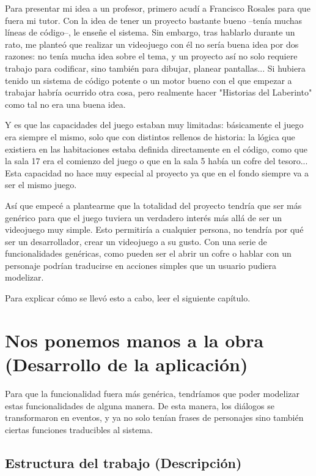 \documentclass[12pt]{article}
\begin{document}
Para presentar mi idea a un profesor, primero acudí a Francisco Rosales para que fuera mi tutor. Con la idea de tener un proyecto bastante bueno –tenía muchas líneas de código–, le enseñe el sistema. Sin embargo, tras hablarlo durante un rato, me planteó que realizar un videojuego con él no sería buena idea por dos razones: no tenía mucha idea sobre el tema, y un proyecto así no solo requiere trabajo para codificar, sino también para dibujar, planear pantallas... Si hubiera tenido un sistema de código potente o un motor bueno con el que empezar a trabajar habría ocurrido otra cosa, pero realmente hacer "Historias del Laberinto" como tal no era una buena idea.

Y es que las capacidades del juego estaban muy limitadas: básicamente el juego era siempre el mismo, solo que con distintos rellenos de historia: la lógica que existiera en las habitaciones estaba definida directamente en el código, como que la sala 17 era el comienzo del juego o que en la sala 5 había un cofre del tesoro...
Esta capacidad no hace muy especial al proyecto ya que en el fondo siempre va a ser el mismo juego.

Así que empecé a plantearme que la totalidad del proyecto tendría que ser más genérico para que el juego tuviera un verdadero interés más allá de ser un videojuego muy simple. Esto permitiría a cualquier persona, no tendría por qué ser un desarrollador, crear un videojuego a su gusto.
Con una serie de funcionalidades genéricas, como pueden ser el abrir un cofre o hablar con un personaje podrían traducirse en acciones simples que un usuario pudiera modelizar.

Para explicar cómo se llevó esto a cabo, leer el siguiente capítulo.

\newpage
\section{Nos ponemos manos a la obra (Desarrollo de la aplicación)}

Para que la funcionalidad fuera más genérica, tendríamos que poder modelizar estas funcionalidades de alguna manera. De esta manera, los diálogos se transformaron en eventos, y ya no solo tenían frases de personajes sino también ciertas funciones traducibles al sistema.

\subsection{Estructura del trabajo (Descripción)}
\end{document}
